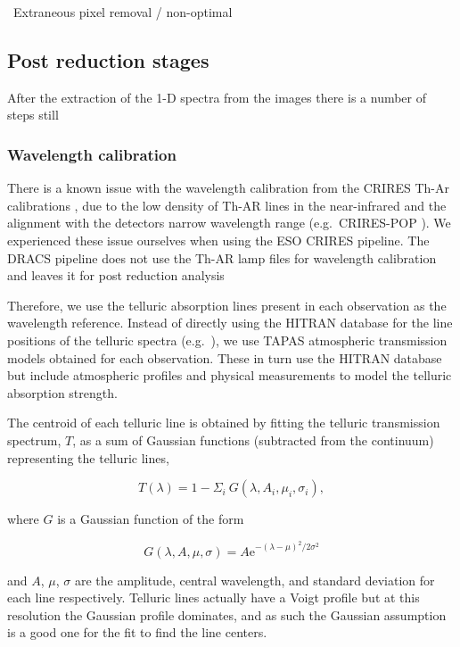 \ Extraneous pixel removal / non-optimal 

\subsection{Post reduction stages}

After the extraction of the 1-D spectra from the images there is a number of steps still 

\subsubsection{Wavelength calibration}
\label{subsec:wave_cal}
There is a known issue with the wavelength calibration from the CRIRES Th-Ar calibrations \citep{kerber_laboratory_2009}, due to the low density of Th-AR lines in the near-infrared and the alignment with the detectors narrow wavelength range (e.g.\ CRIRES-POP \citep{nicholls_crirespop_2017}). We experienced these issue ourselves when using the ESO CRIRES pipeline. The DRACS pipeline does not use the Th-AR lamp files for wavelength calibration and leaves it for post reduction analysis

Therefore, we use the telluric absorption lines present in each observation as the wavelength reference. Instead of directly using the HITRAN database \citep{rothman_hitran2012_2013} for the line positions of the telluric spectra (e.g.~\citep{brogi_signature_2012,brogi_carbon_2014,dekok_detection_2013}), we use TAPAS atmospheric transmission models \citep{bertaux_tapas_2014} obtained for each observation. These in turn use the HITRAN database but include atmospheric profiles and physical measurements to model the telluric absorption strength.

The centroid of each telluric line is obtained by fitting the telluric transmission spectrum, \(T \), as a sum of Gaussian functions (subtracted from the continuum) representing the telluric lines,

\begin{equation}
T(\lambda) = 1 - {\Sigma}_{i}\ G(\lambda, A_{i}, {\mu}_{i}, {\sigma}_{i}),
\end{equation}

where \(G \) is a Gaussian function of the form

\begin{equation}
G(\lambda, A, \mu, \sigma) = {A \textrm{e}}^{{-(\lambda-\mu)}^{2}/2\sigma^{2}}
\end{equation}

and \(A \), \(\mu \), \(\sigma \) are the amplitude, central wavelength, and standard deviation for each line respectively. Telluric lines actually have a  Voigt profile but at this resolution the Gaussian profile dominates, and as such the Gaussian assumption is a good one for the fit to find the line centers.

